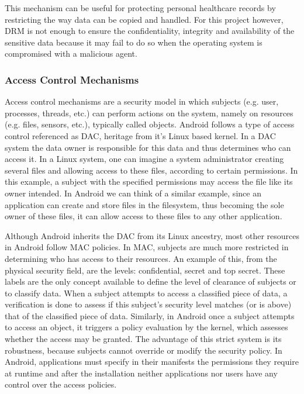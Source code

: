 This mechanism can be useful for protecting personal healthcare records by restricting the way data can be copied and handled. For this project however, DRM is not enough to ensure the confidentiality, integrity and availability of the sensitive data because it may fail to do so when the operating system is compromised with a malicious agent.

\subsubsection{Access Control Mechanisms}

Access control mechanisms are a security model in which subjects (e.g. user, processes, threads, etc.) can perform actions on the system, namely on resources (e.g. files, sensors, etc.), typically called objects. Android follows a type of access control referenced as \ac{DAC}, heritage from it's Linux based kernel. In a \ac{DAC} system the data owner is responsible for this data and thus determines who can access it. In a Linux system, one can imagine a system administrator creating several files and allowing access to these files, according to certain permissions. In this example, a subject with the specified permissions may access the file like its owner intended. In Android we can think of a similar example, since an application can create and store files in the filesystem, thus becoming the sole owner of these files, it can allow access to these files to any other application.

Although Android inherits the \ac{DAC} from its Linux ancestry, most other resources in Android follow \ac{MAC} policies. In \ac{MAC}, subjects are much more restricted in determining who has access to their resources. An example of this, from the physical security field, are the levels: confidential, secret and top secret. These labels are the only concept available to define the level of clearance of subjects or to classify data. When a subject attempts to access a classified piece of data, a verification is done to assess if this subject's security level matches (or is above) that of the classified piece of data. Similarly, in Android once a subject attempts to access an object, it triggers a policy evaluation by the kernel, which assesses whether the access may be granted. The advantage of this strict system is its robustness, because subjects cannot override or modify the security policy. In Android, applications must specify in their manifests the permissions they require at runtime and after the installation neither applications nor users have any control over the access policies.

